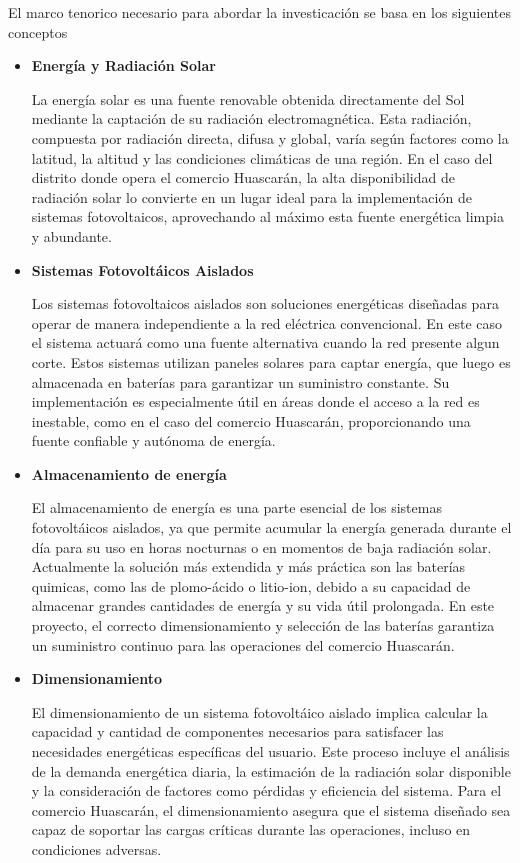 El marco tenorico necesario para abordar la investicación se basa en los siguientes conceptos

\begin{itemize}

  \item \textbf{Energía y Radiación Solar}

  La energía solar es una fuente renovable obtenida directamente del Sol mediante la captación de su radiación electromagnética. Esta radiación, compuesta por radiación directa, difusa y global, varía según factores como la latitud, la altitud y las condiciones climáticas de una región. En el caso del distrito donde opera el comercio Huascarán, la alta disponibilidad de radiación solar lo convierte en un lugar ideal para la implementación de sistemas fotovoltaicos, aprovechando al máximo esta fuente energética limpia y abundante.


  \item \textbf{Sistemas Fotovoltáicos Aislados}

  Los sistemas fotovoltaicos aislados son soluciones energéticas diseñadas para operar de manera independiente a la red eléctrica convencional. En este caso el sistema actuará como una fuente alternativa cuando la red presente algun corte. Estos sistemas utilizan paneles solares para captar energía, que luego es almacenada en baterías para garantizar un suministro constante. Su implementación es especialmente útil en áreas donde el acceso a la red es inestable, como en el caso del comercio Huascarán, proporcionando una fuente confiable y autónoma de energía.


  \item \textbf{Almacenamiento de energía}

  El almacenamiento de energía es una parte esencial de los sistemas fotovoltáicos aislados, ya que permite acumular la energía generada durante el día para su uso en horas nocturnas o en momentos de baja radiación solar. Actualmente la solución más extendida y más práctica son las baterías quimicas, como las de plomo-ácido o litio-ion, debido a su capacidad de almacenar grandes cantidades de energía y su vida útil prolongada. En este proyecto, el correcto dimensionamiento y selección de las baterías garantiza un suministro continuo para las operaciones del comercio Huascarán.


  \item \textbf{Dimensionamiento}

  El dimensionamiento de un sistema fotovoltáico aislado implica calcular la capacidad y cantidad de componentes necesarios para satisfacer las necesidades energéticas específicas del usuario. Este proceso incluye el análisis de la demanda energética diaria, la estimación de la radiación solar disponible y la consideración de factores como pérdidas y eficiencia del sistema. Para el comercio Huascarán, el dimensionamiento asegura que el sistema diseñado sea capaz de soportar las cargas críticas durante las operaciones, incluso en condiciones adversas.



\end{itemize}
